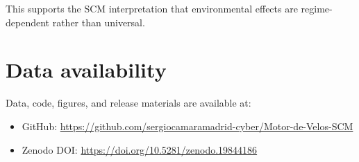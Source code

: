 \documentclass[fleqn,usenatbib]{mnras}
\begin{document}
This supports the SCM interpretation that environmental effects are regime-dependent rather than universal.

\section*{Data availability}

Data, code, figures, and release materials are available at:

\begin{itemize}
\item GitHub: \url{https://github.com/sergiocamaramadrid-cyber/Motor-de-Velos-SCM}
\item Zenodo DOI: \url{https://doi.org/10.5281/zenodo.19844186}
\end{itemize}
\end{document}
